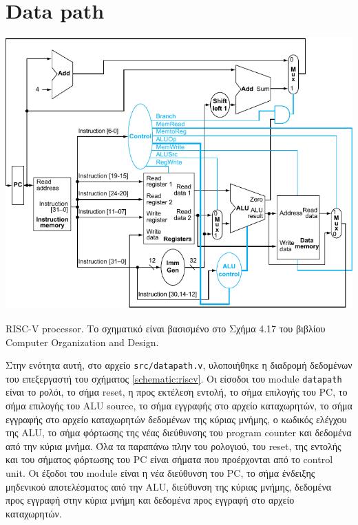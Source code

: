 \section{Data path}

\begin{circuitfig}[H]
	\centering
	\includegraphics[width=\linewidth]{schematics/riscv.pdf}
	\caption{RISC-V processor. Το σχηματικό είναι βασισμένο στο Σχήμα 4.17 του βιβλίου Computer Organization and Design\cite{corg}.}
	\label{schematic:riscv}
\end{circuitfig}

Στην ενότητα αυτή, στο αρχείο \texttt{src/datapath.v}, υλοποιήθηκε η διαδρομή δεδομένων του επεξεργαστή του σχήματος \ref{schematic:riscv}. Οι είσοδοι του module \texttt{datapath} είναι το ρολόι, το σήμα reset, η προς εκτέλεση εντολή, το σήμα επιλογής του PC, το σήμα επιλογής του ALU source, το σήμα εγγραφής στο αρχείο καταχωρητών, το σήμα εγγραφής στο αρχείο καταχωρητών δεδομένων της κύριας μνήμης, ο κωδικός ελέγχου της ALU, το σήμα φόρτωσης της νέας διεύθυνσης του program counter και δεδομένα από την κύρια μνήμα. Όλα τα παραπάνω πλην του ρολογιού, του reset, της εντολής και του σήματος φόρτωσης του PC είναι σήματα που προέρχονται από το control unit. Οι έξοδοι του module είναι η νέα διεύθυνση του PC, το σήμα ένδειξης μηδενικού αποτελέσματος από την ALU, διεύθυνση της κύριας μνήμης, δεδομένα προς εγγραφή στην κύρια μνήμη και δεδομένα προς εγγραφή στο αρχείο καταχωρητών.\par

